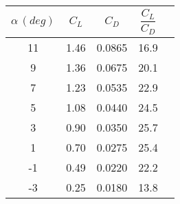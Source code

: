 \begin{tabular}[12pt]{ |c|c|c|c|c| }
    \hline
    { $\alpha \, (deg)$ } & {$C_L$} & {$C_D$} & {$\dfrac{C_L}{C_D}$} \\
    \hline
    11 & 1.46 & 0.0865 & 16.9 \\
    \hline
    9  & 1.36 & 0.0675 & 20.1 \\
    \hline
    7  & 1.23 & 0.0535 & 22.9 \\
    \hline
    5  & 1.08 & 0.0440 & 24.5 \\
    \hline
    3  & 0.90 & 0.0350 & 25.7 \\
    \hline
    1  & 0.70 & 0.0275 & 25.4 \\
    \hline
    -1 & 0.49 & 0.0220 & 22.2 \\
    \hline
    -3 & 0.25 & 0.0180 & 13.8 \\
    \hline
\end{tabular}
